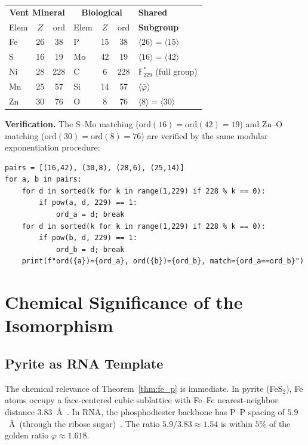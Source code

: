 \documentclass[12pt]{article}
\theoremstyle{principia}
\theoremstyle{definition}
\theoremstyle{remark}
\providecommand{\FF}{\mathbb{F}}
\providecommand{\vp}{\varphi}
\providecommand{\vpbar}{\bar{\varphi}}
\begin{document}
\begin{center}
\begin{tabular}{@{}lcc|lcc|l@{}}
\toprule
\multicolumn{3}{c|}{\textbf{Vent Mineral}} & \multicolumn{3}{c|}{\textbf{Biological}} & \textbf{Shared} \\
Elem & $Z$ & ord & Elem & $Z$ & ord & \textbf{Subgroup} \\
\midrule
Fe & 26 & 38 & P  & 15 & 38 & $\langle 26 \rangle = \langle 15 \rangle$ \\
S  & 16 & 19 & Mo & 42 & 19 & $\langle 16 \rangle = \langle 42 \rangle$ \\
Ni & 28 & 228 & C & 6 & 228 & $\FF_{229}^*$ (full group) \\
Mn & 25 & 57 & Si & 14 & 57 & $\langle \vpbar \rangle$ \\
Zn & 30 & 76 & O  & 8 & 76 & $\langle 8 \rangle = \langle 30 \rangle$ \\
\bottomrule
\end{tabular}
\end{center}

\noindent\textbf{Verification.} The S--Mo matching ($\mathrm{ord}(16) = \mathrm{ord}(42) = 19$) and Zn--O matching ($\mathrm{ord}(30) = \mathrm{ord}(8) = 76$) are verified by the same modular exponentiation procedure:
\begin{verbatim}
pairs = [(16,42), (30,8), (28,6), (25,14)]
for a, b in pairs:
    for d in sorted(k for k in range(1,229) if 228 % k == 0):
        if pow(a, d, 229) == 1:
            ord_a = d; break
    for d in sorted(k for k in range(1,229) if 228 % k == 0):
        if pow(b, d, 229) == 1:
            ord_b = d; break
    print(f"ord({a})={ord_a}, ord({b})={ord_b}, match={ord_a==ord_b}")
\end{verbatim}

\section{Chemical Significance of the Isomorphism}\label{sec:chem}

\subsection{Pyrite as RNA Template}

The chemical relevance of Theorem~\ref{thm:fe_p} is immediate. In pyrite (FeS$_2$), Fe atoms occupy a face-centered cubic sublattice with Fe--Fe nearest-neighbor distance $3.83$~\AA~\cite{Brostigen69}. In RNA, the phosphodiester backbone has P--P spacing of $5.9$~\AA\ (through the ribose sugar)~\cite{Saenger84}. The ratio $5.9 / 3.83 \approx 1.54$ is within $5\%$ of the golden ratio $\vp \approx 1.618$.
\end{document}
